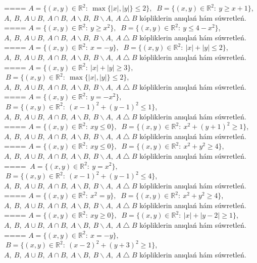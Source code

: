 ====
\(A = \{(x,y) \in \mathbb{R}^{2}:\ \max \{|x|,|y|\} \leq 2\},\) \(\ B = \{(x,y) \in \mathbb{R}^{2}:\ y \geq x + 1\}\), \(A,\ B,\ A \cup B,\ A \cap B,\ A \backslash B,\ B \backslash A,\ A \bigtriangleup B\) kópliklerin anıqlań hám súwretleń.
====
\(A = \{(x,y) \in \mathbb{R}^{2}:\ y \geq x^{2}\},\) \(\ B = \{(x,y) \in \mathbb{R}^{2}:\ y \leq 4 - x^{2}\}\), \(A,\ B,\ A \cup B,\ A \cap B,\ A \backslash B,\ B \backslash A,\ A \bigtriangleup B\) kópliklerin anıqlań hám súwretleń.
====
\(A = \{(x,y) \in \mathbb{R}^{2}:\ x = - y\},\) \(\ B = \{(x,y) \in \mathbb{R}^{2}:\ |x| + |y| \leq 2\}\), \(A,\ B,\ A \cup B,\ A \cap B,\ A \backslash B,\ B \backslash A,\ A \bigtriangleup B\) kópliklerin anıqlań hám súwretleń.
====
\(A = \{(x,y) \in \mathbb{R}^{2}:\ |x| + |y| \geq 3\},\) \(\ B = \{(x,y) \in \mathbb{R}^{2}:\ \max \{|x|,|y|\} \leq 2\}\), \(A,\ B,\ A \cup B,\ A \cap B,\ A \backslash B,\ B \backslash A,\ A \bigtriangleup B\) kópliklerin anıqlań hám súwretleń.
====
\(A = \{(x,y) \in \mathbb{R}^{2}:\ y = - x^{2}\},\) \(\ B = \{(x,y) \in \mathbb{R}^{2}:\ (x - 1)^{2} + (y - 1)^{2} \leq 1\}\), \(A,\ B,\ A \cup B,\ A \cap B,\ A \backslash B,\ B \backslash A,\ A \bigtriangleup B\) kópliklerin anıqlań hám súwretleń.
====
\(A = \{(x,y) \in \mathbb{R}^{2}:\ xy \leq 0\},\) \(\ B = \{(x,y) \in \mathbb{R}^{2}:\ x^{2} + (y + 1)^{2} \geq 1\}\), \(A,\ B,\ A \cup B,\ A \cap B,\ A \backslash B,\ B \backslash A,\ A \bigtriangleup B\) kópliklerin anıqlań hám súwretleń.
====
\(A = \{(x,y) \in \mathbb{R}^{2}:\ xy \leq 0\},\) \(\ B = \{(x,y) \in \mathbb{R}^{2}:\ x^{2} + y^{2} \geq 4\}\), \(A,\ B,\ A \cup B,\ A \cap B,\ A \backslash B,\ B \backslash A,\ A \bigtriangleup B\) kópliklerin anıqlań hám súwretleń.
====
\(\ A = \{(x,y) \in \mathbb{R}^{2}:\ y = x^{2}\},\) \(\ B = \{(x,y) \in \mathbb{R}^{2}:\ (x - 1)^{2} + (y - 1)^{2} \leq 4\}\), \(A,\ B,\ A \cup B,\ A \cap B,\ A \backslash B,\ B \backslash A,\ A \bigtriangleup B\) kópliklerin anıqlań hám súwretleń.
====
\(A = \{(x,y) \in \mathbb{R}^{2}:\ x^{2} = y\},\) \(\ B = \{(x,y) \in \mathbb{R}^{2}:\ x^{2} + y^{2} \geq 4\}\), \(A,\ B,\ A \cup B,\ A \cap B,\ A \backslash B,\ B \backslash A,\ A \bigtriangleup B\) kópliklerin anıqlań hám súwretleń.
====
\(A = \{(x,y) \in \mathbb{R}^{2}:\ xy \geq 0\},\) \(\ B = \{(x,y) \in \mathbb{R}^{2}:\ |x| + |y - 2| \geq 1\}\), \(A,\ B,\ A \cup B,\ A \cap B,\ A \backslash B,\ B \backslash A,\ A \bigtriangleup B\) kópliklerin anıqlań hám súwretleń.
====
\(A = \{(x,y) \in \mathbb{R}^{2}:\ x = - y\},\) \(\ B = \{(x,y) \in \mathbb{R}^{2}:\ (x - 2)^{2} + (y + 3)^{2} \geq 1\}\), \(A,\ B,\ A \cup B,\ A \cap B,\ A \backslash B,\ B \backslash A,\ A \bigtriangleup B\) kópliklerin anıqlań hám súwretleń.

